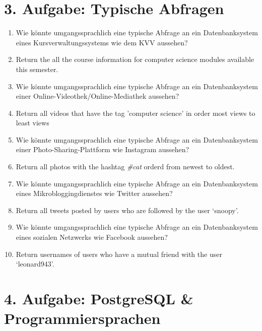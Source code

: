 \documentclass[12pt]{report}
\newcommand{\answer}{\textbf{A:}}
\begin{document}
\newpage

\section*{3. Aufgabe: Typische Abfragen}

\begin{enumerate}
\item[(2 P)] Wie könnte umgangssprachlich eine typische Abfrage an ein Datenbanksystem eines Kursverwaltungssystems wie dem KVV aussehen?
\item[\answer]
  Return the all the course information for computer science modules available this semester.

\item[(2 P)] Wie könnte umgangssprachlich eine typische Abfrage an ein Datenbanksystem einer Online-Videothek/Online-Mediathek aussehen?
\item[\answer]
  Return all videos that have the tag 'computer science' in order most views to least views

\item[(2 P)] Wie könnte umgangssprachlich eine typische Abfrage an ein Datenbanksystem einer Photo-Sharing-Plattform wie Instagram aussehen?
\item[\answer]
  Return all photos with the hashtag \textit{\#cat} orderd from newest to oldest.

\item[(2 P)] Wie könnte umgangssprachlich eine typische Abfrage an ein Datenbanksystem eines Mikrobloggingdienstes wie Twitter aussehen?
\item[\answer]
  Return all tweets posted by users who are followed by the user `snoopy'.

\item[(2 P)] Wie könnte umgangssprachlich eine typische Abfrage an ein Datenbanksystem eines sozialen Netzwerks wie Facebook aussehen?
\item[\answer]
  Return usernames of users who have a mutual friend with the user `leonard943'.
\end{enumerate}

\newpage

\section*{4. Aufgabe: PostgreSQL \& Programmiersprachen}
\end{document}
